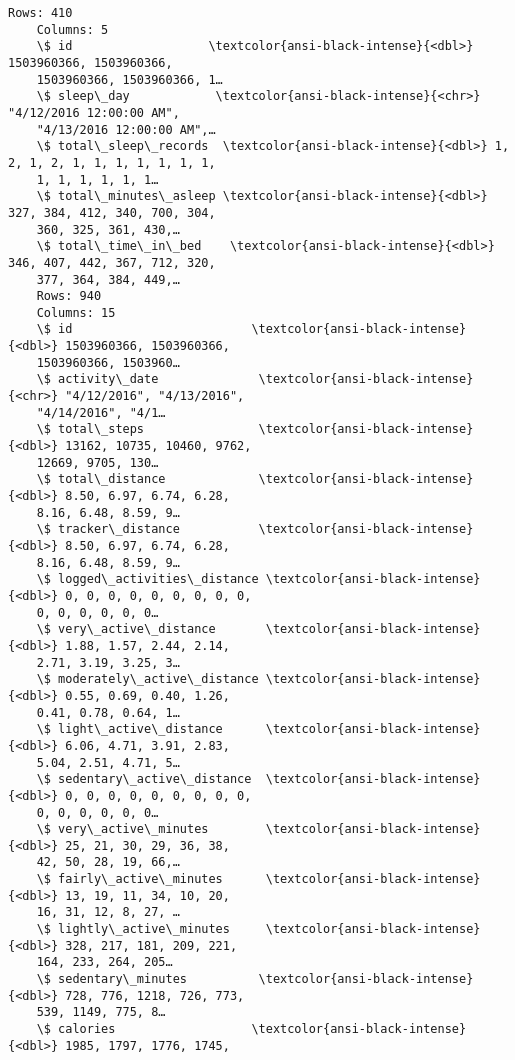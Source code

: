 \documentclass[11pt]{article}
\begin{document}
\begin{Verbatim}[commandchars=\\\{\}]
    Rows: 410
    Columns: 5
    \$ id                   \textcolor{ansi-black-intense}{<dbl>} 1503960366, 1503960366,
    1503960366, 1503960366, 1…
    \$ sleep\_day            \textcolor{ansi-black-intense}{<chr>} "4/12/2016 12:00:00 AM",
    "4/13/2016 12:00:00 AM",…
    \$ total\_sleep\_records  \textcolor{ansi-black-intense}{<dbl>} 1, 2, 1, 2, 1, 1, 1, 1, 1, 1, 1,
    1, 1, 1, 1, 1, 1…
    \$ total\_minutes\_asleep \textcolor{ansi-black-intense}{<dbl>} 327, 384, 412, 340, 700, 304,
    360, 325, 361, 430,…
    \$ total\_time\_in\_bed    \textcolor{ansi-black-intense}{<dbl>} 346, 407, 442, 367, 712, 320,
    377, 364, 384, 449,…
    Rows: 940
    Columns: 15
    \$ id                         \textcolor{ansi-black-intense}{<dbl>} 1503960366, 1503960366,
    1503960366, 1503960…
    \$ activity\_date              \textcolor{ansi-black-intense}{<chr>} "4/12/2016", "4/13/2016",
    "4/14/2016", "4/1…
    \$ total\_steps                \textcolor{ansi-black-intense}{<dbl>} 13162, 10735, 10460, 9762,
    12669, 9705, 130…
    \$ total\_distance             \textcolor{ansi-black-intense}{<dbl>} 8.50, 6.97, 6.74, 6.28,
    8.16, 6.48, 8.59, 9…
    \$ tracker\_distance           \textcolor{ansi-black-intense}{<dbl>} 8.50, 6.97, 6.74, 6.28,
    8.16, 6.48, 8.59, 9…
    \$ logged\_activities\_distance \textcolor{ansi-black-intense}{<dbl>} 0, 0, 0, 0, 0, 0, 0, 0, 0,
    0, 0, 0, 0, 0, 0…
    \$ very\_active\_distance       \textcolor{ansi-black-intense}{<dbl>} 1.88, 1.57, 2.44, 2.14,
    2.71, 3.19, 3.25, 3…
    \$ moderately\_active\_distance \textcolor{ansi-black-intense}{<dbl>} 0.55, 0.69, 0.40, 1.26,
    0.41, 0.78, 0.64, 1…
    \$ light\_active\_distance      \textcolor{ansi-black-intense}{<dbl>} 6.06, 4.71, 3.91, 2.83,
    5.04, 2.51, 4.71, 5…
    \$ sedentary\_active\_distance  \textcolor{ansi-black-intense}{<dbl>} 0, 0, 0, 0, 0, 0, 0, 0, 0,
    0, 0, 0, 0, 0, 0…
    \$ very\_active\_minutes        \textcolor{ansi-black-intense}{<dbl>} 25, 21, 30, 29, 36, 38,
    42, 50, 28, 19, 66,…
    \$ fairly\_active\_minutes      \textcolor{ansi-black-intense}{<dbl>} 13, 19, 11, 34, 10, 20,
    16, 31, 12, 8, 27, …
    \$ lightly\_active\_minutes     \textcolor{ansi-black-intense}{<dbl>} 328, 217, 181, 209, 221,
    164, 233, 264, 205…
    \$ sedentary\_minutes          \textcolor{ansi-black-intense}{<dbl>} 728, 776, 1218, 726, 773,
    539, 1149, 775, 8…
    \$ calories                   \textcolor{ansi-black-intense}{<dbl>} 1985, 1797, 1776, 1745,

\end{Verbatim}
\end{document}
